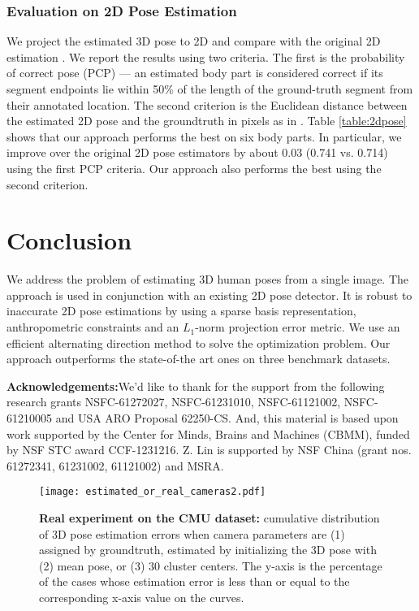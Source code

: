 \documentclass[10pt,twocolumn,letterpaper]{article}
\begin{document}
\subsubsection{Evaluation on 2D Pose Estimation}
We project the estimated 3D pose to 2D and compare with the
original 2D estimation \cite{Yang2D}. We report the results
using two criteria. The first is the probability of correct pose
(PCP) \cite{Yang2D} --- an estimated body part is considered correct if its
segment endpoints lie within 50\% of the length of the
ground-truth segment from their annotated location.
The second criterion is the Euclidean distance between the
estimated 2D pose and the groundtruth in pixels as in
\cite{SimoSerraCVPR2012}. Table \ref{table:2dpose} shows that our
approach performs the best on six body parts. In particular, we
improve over the original 2D pose estimators by about $0.03$
(0.741 vs. 0.714) using the first PCP criteria. Our approach also performs the best using the
second criterion.





\section{Conclusion}
\label{sec:summary} We address the problem of estimating 3D human
poses from a single image. The approach is used in conjunction
with an existing 2D pose detector. It is robust to inaccurate 2D pose
estimations by using a sparse basis representation,
anthropometric constraints and an $L_1$-norm projection error
metric. We use an efficient alternating direction method to solve
the optimization problem. Our approach outperforms the
state-of-the art ones on three benchmark datasets.

\textbf{Acknowledgements:}We'd like to thank for the support from the following research grants NSFC-61272027, NSFC-61231010, NSFC-61121002, NSFC-61210005 and USA ARO Proposal 62250-CS. And, this material is based upon work supported by the Center for Minds, Brains and Machines (CBMM), funded by NSF STC award CCF-1231216. Z. Lin is supported by NSF China (grant nos. 61272341, 61231002, 61121002) and MSRA.
\begin{figure}
\centering
\texttt{[image: estimated\_or\_real\_cameras2.pdf]}
\caption{\textbf{Real experiment on the CMU dataset:} cumulative
distribution of 3D pose estimation errors when camera parameters
are (1) assigned by groundtruth, estimated by initializing the 3D
pose with (2) mean pose, or (3) $30$ cluster centers. The y-axis is the percentage of the cases whose estimation error is less than or equal to the corresponding x-axis value on the curves. } \vspace{-1em} \label{fig:camera}
\end{figure}
\end{document}
